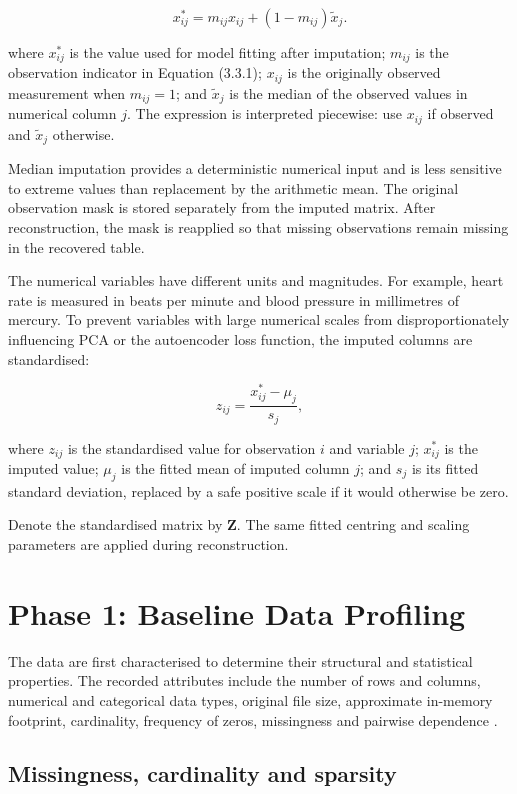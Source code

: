 \[
x^{*}_{ij}=m_{ij}x_{ij}+(1-m_{ij})\tilde{x}_j.\tag{3.3.2}
\]

\noindent where \(x^*_{ij}\) is the value used for model fitting after imputation;
\(m_{ij}\) is the observation indicator in Equation (3.3.1); \(x_{ij}\)
is the originally observed measurement when \(m_{ij}=1\); and
\(\tilde{x}_j\) is the median of the observed values in numerical column
\(j\). The expression is interpreted piecewise: use \(x_{ij}\) if
observed and \(\tilde{x}_j\) otherwise.

\noindent Median imputation provides a deterministic numerical input and is less
sensitive to extreme values than replacement by the arithmetic mean. The
original observation mask is stored separately from the imputed matrix.
After reconstruction, the mask is reapplied so that missing observations
remain missing in the recovered table.

\noindent The numerical variables have different units and magnitudes. For
example, heart rate is measured in beats per minute and blood pressure
in millimetres of mercury. To prevent variables with large numerical
scales from disproportionately influencing PCA or the autoencoder loss
function, the imputed columns are standardised:

\[
z_{ij}=\frac{x^{*}_{ij}-\mu_j}{s_j},\tag{3.3.3}
\]

\noindent where \(z_{ij}\) is the standardised value for observation \(i\) and
variable \(j\); \(x^*_{ij}\) is the imputed value; \(\mu_j\) is the
fitted mean of imputed column \(j\); and \(s_j\) is its fitted standard
deviation, replaced by a safe positive scale if it would otherwise be
zero.

\noindent Denote the standardised matrix by \(\boldsymbol{Z}\). The same fitted
centring and scaling parameters are applied during reconstruction.

\section{Phase 1: Baseline Data Profiling}\label{phase-1-baseline-data-profiling}

The data are first characterised to determine their structural and
statistical properties. The recorded attributes include the number of
rows and columns, numerical and categorical data types, original file
size, approximate in-memory footprint, cardinality, frequency of zeros,
missingness and pairwise dependence \citep{Kahn2016}.

\subsection{Missingness, cardinality and sparsity}\label{missingness-cardinality-and-sparsity}

